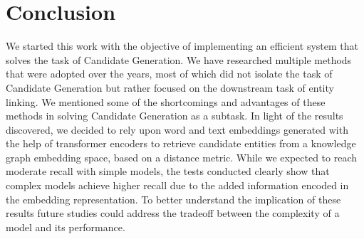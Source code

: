 \chapter{Conclusion}
\label{ch:Conclusion}
We started this work with the objective of implementing an efficient system that solves the task of Candidate Generation.\newline
We have researched multiple methods that were adopted over the years, most of which did not isolate the task of Candidate Generation but rather focused on the downstream task of entity linking. We mentioned some of the shortcomings and advantages of these methods in solving Candidate Generation as a subtask.\newline
In light of the results discovered, we decided to rely upon word and text embeddings generated with the help of transformer encoders to retrieve candidate entities from a knowledge graph embedding space, based on a distance metric.\newline
While we expected to reach moderate recall with simple models, the tests conducted clearly show that complex models achieve higher recall due to the added information encoded in the embedding representation. \newline
To better understand the implication of these results future studies could address the tradeoff between the complexity of a model and its performance.
